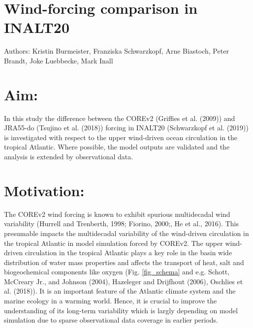 \documentclass[a4paperpaper,]{article}
\date{}
\begin{document}
\section{Wind-forcing comparison in
INALT20}\label{wind-forcing-comparison-in-inalt20}

Authors: Kristin Burmeister, Franziska Schwarzkopf, Arne Biastoch, Peter
Brandt, Joke Luebbecke, Mark Inall

\section{Aim:}\label{aim}

In this study the difference between the COREv2 (Griffies et al. (2009))
and JRA55-do (Tsujino et al. (2018)) forcing in INALT20 (Schwarzkopf et
al. (2019)) is investigated with respect to the upper wind-driven ocean
circulation in the tropical Atlantic. Where possible, the model outputs
are validated and the analysis is extended by observational data.

\section{Motivation:}\label{motivation}

The COREv2 wind forcing is known to exhibit spurious multidecadal wind
variability (Hurrell and Trenberth, 1998; Fiorino, 2000;, He et al.,
2016). This presumable impacts the multidecadal variability of the
wind-driven circulation in the tropical Atlantic in model simulation
forced by COREv2. The upper wind-driven circulation in the tropical
Atlantic plays a key role in the basin wide distribution of water mass
properties and affects the transport of heat, salt and biogeochemical
components like oxygen (Fig. \ref{fig_schema} and e.g. Schott, McCreary
Jr., and Johnson (2004), Hazeleger and Drijfhout (2006), Oschlies et al.
(2018)). It is an important feature of the Atlantic climate system and
the marine ecology in a warming world. Hence, it is crucial to improve
the understanding of its long-term variability which is largly depending
on model simulation due to sparse observational data coverage in earlier
periods.
\end{document}
